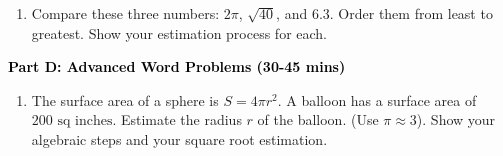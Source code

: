 \documentclass[12pt, letterpaper, fleqn]{article}
\begin{document}
\vspace{3mm}

\begin{enumerate}[itemsep=5.5cm, leftmargin=0.6cm, resume]
\item Compare these three numbers: $2\pi$, $\sqrt{40}$, and $6.3$. Order them from least to greatest. Show your estimation process for each.
\end{enumerate}

\newpage

\begin{tcolorbox}[colback=customteal!20]
\large\textcolor{black}{\textbf{Part D: Advanced Word Problems (30-45 mins)}}
\end{tcolorbox}

\vspace{3mm}

\begin{enumerate}[itemsep=5.5cm, leftmargin=0.6cm, resume]
\item The surface area of a sphere is $S = 4\pi r^2$. A balloon has a surface area of $200\text{ sq inches}$. Estimate the radius $r$ of the balloon. (Use $\pi \approx 3$). Show your algebraic steps and your square root estimation.
\end{enumerate}
\end{document}
